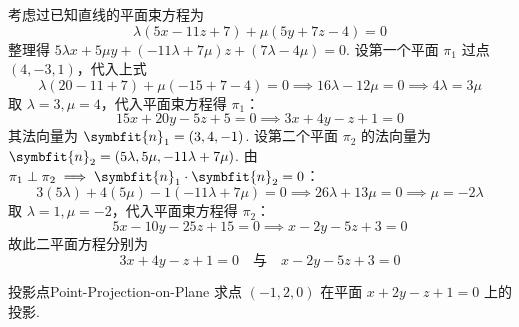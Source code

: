 \begin{solution}
    考虑过已知直线的平面束方程为
    \begin{equation}
        \lambda(5x - 11z + 7) + \mu(5y + 7z - 4) = 0
    \end{equation}
    整理得 $5\lambda x + 5\mu y + (-11\lambda + 7\mu)z + (7\lambda - 4\mu) = 0$.
    设第一个平面 $\pi_1$ 过点 $(4, -3, 1)$，代入上式
    \begin{equation}
        \lambda(20 - 11 + 7) + \mu(-15 + 7 - 4) = 0 \implies 16\lambda - 12\mu = 0 \implies 4\lambda = 3\mu
    \end{equation}
    取 $\lambda = 3, \mu = 4$，代入平面束方程得 $\pi_1$：
    \begin{equation}
        15x + 20y - 5z + 5 = 0 \implies 3x + 4y - z + 1 = 0
    \end{equation}
    其法向量为 $\symbfit{n}_1 = (3, 4, -1)$. 设第二个平面 $\pi_2$ 的法向量为 $\symbfit{n}_2 = (5\lambda, 5\mu, -11\lambda + 7\mu)$.
    由 $\pi_1 \perp \pi_2 \implies \symbfit{n}_1 \cdot \symbfit{n}_2 = 0$：
    \begin{equation}
        3(5\lambda) + 4(5\mu) - 1(-11\lambda + 7\mu) = 0 \implies 26\lambda + 13\mu = 0 \implies \mu = -2\lambda
    \end{equation}
    取 $\lambda = 1, \mu = -2$，代入平面束方程得 $\pi_2$：
    \begin{equation}
        5x - 10y - 25z + 15 = 0 \implies x - 2y - 5z + 3 = 0
    \end{equation}
    故此二平面方程分别为
    \begin{equation}
        \boxed{3x + 4y - z + 1 = 0 \quad \text{与} \quad x - 2y - 5z + 3 = 0}
    \end{equation}
\end{solution}

\begin{problem}{投影点}{Point-Projection-on-Plane}
    求点 $(-1, 2, 0)$ 在平面 $x + 2y - z + 1 = 0$ 上的投影.
\end{problem}

